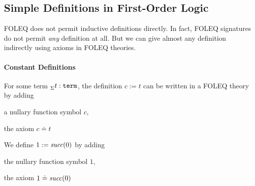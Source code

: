 

\subsection{Simple Definitions in First-Order Logic}

FOLEQ does not permit inductive definitions directly.
In fact, FOLEQ signatures do not permit \emph{any} definition at all.
But we can give almost any definition indirectly using axioms in FOLEQ theories.

\paragraph{Constant Definitions}
For some term $^{}_{\Sigma}t:\mathtt{term}$, the definition $c:=t$ can be written in a FOLEQ  theory by adding
\begin{compactitem}
\item a nullary function symbol $c$,
\item the axiom $c\doteq t$
\end{compactitem}

\begin{example}\label{ex:foldef:nat2}
We define $1:=\mathit{succ}(0)$ by adding
\begin{compactitem}
\item the nullary function symbol $1$,
\item the axiom $1\doteq \mathit{succ}(0)$
\end{compactitem}
\end{example}

